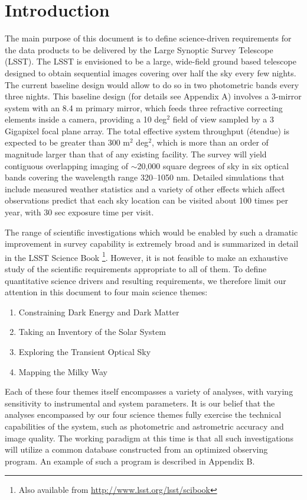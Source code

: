 \section{Introduction}

The main purpose of this document is to define science-driven requirements for the
data products to be delivered by the Large Synoptic Survey Telescope (LSST).
The LSST is envisioned to be a large, wide-field ground based telescope
designed to obtain sequential images covering over half the sky every few nights.
The current baseline design would allow to do so in two photometric bands every three
nights. This baseline design (for details see Appendix A) involves a 3-mirror system with an
8.4 m primary mirror, which feeds three refractive correcting elements inside a camera,
providing a 10 deg$^2$ field of view sampled by a 3 Gigapixel focal plane array.
The total effective system throughput (\'etendue) is expected to be greater than
300 m$^2$ deg$^2$,
which is more than an order of magnitude larger than that of any existing facility.
The survey will yield contiguous overlapping imaging of $\sim$20,000 square degrees
of sky in six optical bands covering the wavelength range 320--1050 nm.
Detailed simulations that include measured weather statistics and a variety
of other effects which affect observations predict that each sky location can be
visited about 100 times per year, with 30 sec exposure time per visit.

The range of scientific investigations which would be enabled by such a
dramatic improvement in survey capability is extremely broad and
is summarized in detail in the LSST Science Book \citep{2009arXiv0912.0201L}\footnote{Also available from
\url{http://www.lsst.org/lsst/scibook}}.  However, it is not feasible to make an exhaustive study of the scientific requirements
appropriate to all of them. To define quantitative science drivers and resulting requirements,
we therefore limit our attention in this document to four
main science themes:
\begin{enumerate}
\item Constraining Dark Energy and Dark Matter
\item Taking an Inventory of the Solar System
\item Exploring the Transient Optical Sky
\item Mapping the Milky Way
\end{enumerate}

Each of these four themes itself encompasses a variety of analyses, with
varying sensitivity to instrumental and system parameters.  It is our belief
that the analyses encompassed by our four science themes
fully exercise the technical capabilities of the system,
such as photometric and astrometric accuracy and image quality.  The working
paradigm at this time is that all such investigations will utilize a common
database constructed from an optimized observing program. An example of
such a program is described in Appendix B.

